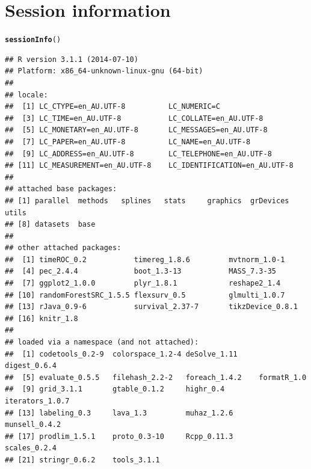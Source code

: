 \documentclass{article}\usepackage[]{graphicx}\usepackage[]{color}
\makeatletter
\newcommand{\hlstd}[1]{\textcolor[rgb]{0.345,0.345,0.345}{#1}}%
\newcommand{\hlkwd}[1]{\textcolor[rgb]{0.737,0.353,0.396}{\textbf{#1}}}%
\newenvironment{kframe}{%
 \def\at@end@of@kframe{}%
 \ifinner\ifhmode%
  \def\at@end@of@kframe{\end{minipage}}%
  \begin{minipage}{\columnwidth}%
 \fi\fi%
 \def\FrameCommand##1{\hskip\@totalleftmargin \hskip-\fboxsep
 \colorbox{shadecolor}{##1}\hskip-\fboxsep
     \hskip-\linewidth \hskip-\@totalleftmargin \hskip\columnwidth}%
 \MakeFramed {\advance\hsize-\width
   \@totalleftmargin\z@ \linewidth\hsize
   \@setminipage}}%
 {\par\unskip\endMakeFramed%
 \at@end@of@kframe}
\newenvironment{knitrout}{}{} %
\makeatother
\begin{document}
\section{Session information}
\begin{knitrout}
\color{fgcolor}\begin{kframe}
\begin{alltt}
\hlkwd{sessionInfo}\hlstd{()}
\end{alltt}
\begin{verbatim}
## R version 3.1.1 (2014-07-10)
## Platform: x86_64-unknown-linux-gnu (64-bit)
## 
## locale:
##  [1] LC_CTYPE=en_AU.UTF-8          LC_NUMERIC=C                 
##  [3] LC_TIME=en_AU.UTF-8           LC_COLLATE=en_AU.UTF-8       
##  [5] LC_MONETARY=en_AU.UTF-8       LC_MESSAGES=en_AU.UTF-8      
##  [7] LC_PAPER=en_AU.UTF-8          LC_NAME=en_AU.UTF-8          
##  [9] LC_ADDRESS=en_AU.UTF-8        LC_TELEPHONE=en_AU.UTF-8     
## [11] LC_MEASUREMENT=en_AU.UTF-8    LC_IDENTIFICATION=en_AU.UTF-8
## 
## attached base packages:
## [1] parallel  methods   splines   stats     graphics  grDevices utils    
## [8] datasets  base     
## 
## other attached packages:
##  [1] timeROC_0.2           timereg_1.8.6         mvtnorm_1.0-1        
##  [4] pec_2.4.4             boot_1.3-13           MASS_7.3-35          
##  [7] ggplot2_1.0.0         plyr_1.8.1            reshape2_1.4         
## [10] randomForestSRC_1.5.5 flexsurv_0.5          glmulti_1.0.7        
## [13] rJava_0.9-6           survival_2.37-7       tikzDevice_0.8.1     
## [16] knitr_1.8            
## 
## loaded via a namespace (and not attached):
##  [1] codetools_0.2-9  colorspace_1.2-4 deSolve_1.11     digest_0.6.4    
##  [5] evaluate_0.5.5   filehash_2.2-2   foreach_1.4.2    formatR_1.0     
##  [9] grid_3.1.1       gtable_0.1.2     highr_0.4        iterators_1.0.7 
## [13] labeling_0.3     lava_1.3         muhaz_1.2.6      munsell_0.4.2   
## [17] prodlim_1.5.1    proto_0.3-10     Rcpp_0.11.3      scales_0.2.4    
## [21] stringr_0.6.2    tools_3.1.1
\end{verbatim}
\end{kframe}
\end{knitrout}
\end{document}
